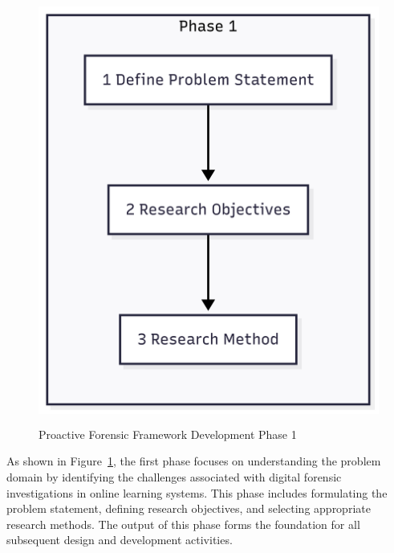 \begin{figure}[H]
    \centering
    \includegraphics[height=14cm]{figure/framework-development-phase-1.png}
    \caption{Proactive Forensic Framework Development Phase 1}
    \label{fig:framework-development-phase-1}
\end{figure}

As shown in Figure~\ref{fig:framework-development-phase-1}, the first phase focuses on understanding the problem domain by identifying the challenges associated with digital forensic investigations in online learning systems. This phase includes formulating the problem statement, defining research objectives, and selecting appropriate research methods. The output of this phase forms the foundation for all subsequent design and development activities.


